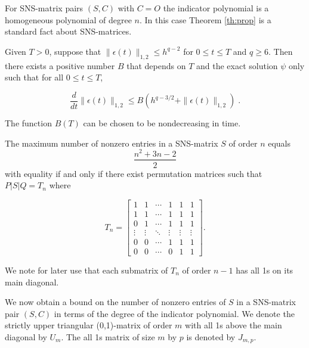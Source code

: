 \documentclass[final,leqno,onetabnum]{siamltex0315}
\newcommand{\pe}{\psi}
\begin{document}
For SNS-matrix pairs $(S,C)$ with $C=O$ the indicator
polynomial is a homogeneous polynomial of degree $n$. In
this case Theorem \ref{th:prop} is a standard fact about
SNS-matrices.
 
\begin{lemma}[{\rm stability}]
\label{stability}
Given $T>0$, suppose that $\| \epsilon (t) \|_{1,2} \leq h^{q-2}$
for $0 \leq t \leq T$ and $q \geq 6$. 
Then there exists a positive number $B$ that depends on
$T$ and the exact solution $\pe$ only such that for all $0 \leq t \leq T$,
\begin{linenomath*}
\begin{equation}
\label{Gron}
\frac {d}{dt} \| \epsilon (t) \| _{1,2}  \leq B
   ( h^{q-3/2} + \| \epsilon (t) \|_{1,2})\;.
\end{equation}
\end{linenomath*}
The function $B(T)$ can be chosen to be nondecreasing in time.
\end{lemma}
 
 
\begin{theorem} 
\label{th:gibson} 
The maximum number of nonzero entries in a {\rm SNS}-matrix
$S$ of order $n$ equals \[\frac{n^{2}+3n-2}{2}\] with
equality if and only if there exist permutation matrices
such that $P|S|Q=T_{n}$ where
\begin{linenomath*}
\begin{equation} 
\label{eq:gibson} 
T_{n}=\left[\begin{array}{cccccc} 1&1&\cdots&1&1&1\\
1&1&\cdots&1&1&1\\ 0&1&\cdots&1&1&1\\ 
\vdots&\vdots&\ddots&\vdots&\vdots&\vdots\\ 
0&0&\cdots&1&1&1\\ 0&0&\cdots&0&1&1\end{array}\right]. 
\end{equation} 
\end{linenomath*}
\end{theorem} 
 
We note for later use that each submatrix of $T_{n}$ of
order $n-1$ has all 1s on its main diagonal. 
 
We now obtain a bound on the number of nonzero entries of
$S$ in a SNS-matrix pair $(S,C)$ in terms of the degree of
the indicator polynomial. We denote the strictly upper
triangular (0,1)-matrix of order $m$ with all 1s above the
main diagonal by $U_{m}$. The all 1s matrix of size $m$ by
$p$ is denoted by $J_{m,p}$.
 
\end{document}
